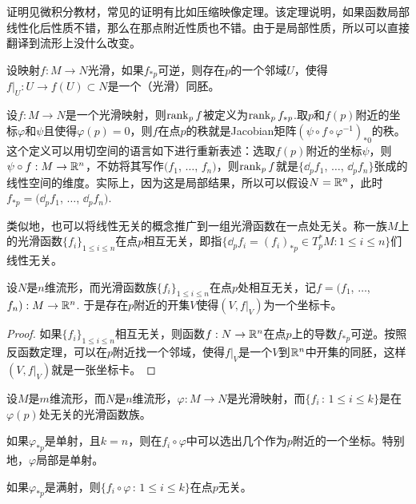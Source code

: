 证明见微积分教材，常见的证明有比如压缩映像定理。该定理说明，如果函数局部线性化后性质不错，那么在那点附近性质也不错。由于是局部性质，所以可以直接翻译到流形上没什么改变。

\begin{thm}[流形上的反函数定理]
设映射$f:M\to N$光滑，如果$f_{*p}$可逆，则存在$p$的一个邻域$U$，使得$f|_U:U\to f(U)\subset N$是一个（光滑）同胚。
\end{thm}

\begin{para}
设$f:M\to N$是一个光滑映射，则$\operatorname{rank}_p f$被定义为$\operatorname{rank}_p f_{*p}$.取$p$和$f(p)$附近的坐标$\varphi$和$\psi$且使得$\varphi(p)=0$，则$f$在点$p$的秩就是Jacobian矩阵$(\psi\circ f \circ \varphi^{-1})_{*0}$的秩。这个定义可以用切空间的语言如下进行重新表述：选取$f(p)$附近的坐标$\psi$，则$\psi\circ f:M\to \mathbb{R}^n$，不妨将其写作$(f_1$, $\dots$, $f_n)$，则$\operatorname{rank}_p f$就是$\{\dd_pf_1$, $\dots$, $\dd_pf_n\}$张成的线性空间的维度。实际上，因为这是局部结果，所以可以假设$N=\mathbb{R}^n$，此时$f_{*p}=(\dd_pf_1$, $\dots$, $\dd_pf_n)$.

类似地，也可以将线性无关的概念推广到一组光滑函数在一点处无关。称一族$M$上的光滑函数$\{f_i\}_{1\leq i\leq n}$在点$p$相互无关，即指$\{\dd_p f_i=(f_i)_{*p}\in T_p^*M:1\leq i\leq n\}$们线性无关。
\end{para}

\begin{pro}
设$N$是$n$维流形，而光滑函数族$\{f_i\}_{1\leq i\leq n}$在点$p$处相互无关，记$f=(f_1$, $\dots$, $f_n):M\to \mathbb{R}^n$. 于是存在$p$附近的开集$V$使得$(V,f|_V)$为一个坐标卡。
\end{pro}

\begin{proof}
如果$\{f_i\}_{1\leq i\leq n}$相互无关，则函数$f:N\to \mathbb{R}^n$在点$p$上的导数$f_{*p}$可逆。按照反函数定理，可以在$p$附近找一个邻域，使得$f|_V$是一个$V$到$\mathbb{R}^n$中开集的同胚，这样$(V,f|_V)$就是一张坐标卡。
\end{proof}



\begin{pro}\label{pro:111}
设$M$是$m$维流形，而$N$是$n$维流形，$\varphi:M\to N$是光滑映射，而$\{f_i\,:\,1\leq i\leq k\}$是在$\varphi(p)$处无关的光滑函数族。
\begin{compactenum}
\item 如果$\varphi_{*p}$是单射，且$k=n$，则在$f_i\circ\varphi$中可以选出几个作为$p$附近的一个坐标。特别地，$\varphi$局部是单射。
\item 如果$\varphi_{*p}$是满射，则$\{f_i\circ \varphi\,:\,1\leq i\leq k\}$在点$p$无关。
\end{compactenum}
\end{pro}

